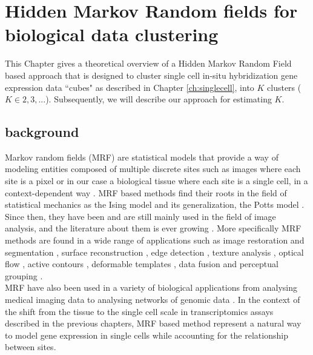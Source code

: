 \chapter{Hidden Markov Random fields for biological data clustering}\label{ch:HMRF} 
This Chapter gives a theoretical overview of a Hidden Markov Random Field based approach that is designed to cluster single cell in-situ hybridization gene expression data ``cubes" as described in Chapter \ref{ch:singlecell}, into $K$ clusters ($K \in {2, 3,...}$). Subsequently, we will describe our approach for estimating $K$.

	\section{background}
	Markov random fields (MRF) are statistical models that provide a way of modeling entities composed of multiple discrete sites such as images where each site is a pixel or in our case a biological tissue where each site is a single cell, in a context-dependent way \cite{li09}. MRF based methods find their roots in the field of statistical mechanics as the Ising model \cite{Ising25} and its generalization, the Potts model \cite{Wu82}. Since then, they have been and are still mainly used in the field of image analysis, and the literature about them is ever growing \cite{rozanov82,li95}. More specifically MRF methods are found in a wide range of applications such as image restoration and segmentation \cite{zhang01}, surface reconstruction \cite{paulsen10}, edge detection \cite{zerubia93}, texture analysis \cite{clausi04}, optical flow \cite{heitz93}, active contours \cite{martin05}, deformable templates \cite{mignotte01}, data fusion \cite{wright89} and perceptual grouping \cite{fields97}.\\
	
	MRF have also been used in a variety of biological applications from analysing medical imaging data \cite{zhang01,held97,descombes98} to analysing networks of genomic data \cite{wei07}. In the context of the shift from the tissue to the single cell scale in transcriptomics assays described in the previous chapters, MRF based method represent a natural way to model gene expression in single cells while accounting for the relationship between sites.\\
	
